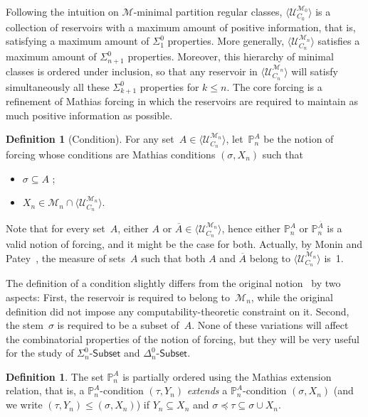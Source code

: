 \documentclass{article}
\def\PP{\mathbb{P}}
\def\U{\mathcal{U}}
\def\M{\mathcal{M}}
\def\PP{\mathbb{P}}
\newcommand{\Sub}[1]{{#1}\mbox{-}\mathsf{Subset}}
\numberwithin{theorem}{section}
\theoremstyle{definition}
\newtheorem{definition}[theorem]{Definition}
\begin{document}
Following the intuition on $\M$-minimal partition regular classes, $\langle \U_{C_0}^{\M_0} \rangle$ is a collection of reservoirs with a maximum amount of positive information, that is, satisfying a maximum amount of $\Sigma^0_1$ properties. More generally, $\langle \U_{C_n}^{\M_n} \rangle$ satisfies a maximum amount of $\Sigma^0_{n+1}$ properties. Moreover, this hierarchy of minimal classes is ordered under inclusion, so that any reservoir in $\langle \U_{C_n}^{\M_n} \rangle$ will satisfy simultaneously all these $\Sigma^0_{k+1}$ properties for $k \leq n$. The core forcing is a refinement of Mathias forcing in which the reservoirs are required to maintain as much positive information as possible.

\begin{definition}[Condition]
For any set~$A \in \langle \U_{C_n}^{\M_n} \rangle$, let~$\PP^A_n$ be the notion of forcing whose conditions are Mathias conditions $(\sigma, X_n)$ such that
 \begin{itemize}
    \item $\sigma \subseteq A$ ;
    \item $X_n \in \M_n \cap \langle \U_{C_n}^{\M_n} \rangle$.
\end{itemize}
\end{definition}

Note that for every set~$A$, either $A$ or $\overline{A} \in \langle \U_{C_n}^{\M_n} \rangle$, hence either $\PP^A_n$ or $\PP^{\overline{A}}_n$ is a valid notion of forcing, and it might be the case for both. Actually, by Monin and Patey~\cite[Proposition 2.7]{monin2022partition}, the measure of sets~$A$ such that both $A$ and $\overline{A}$ belong to $\langle \U_{C_n}^{\M_n} \rangle$ is~1.

The definition of a condition slightly differs from the original notion~\cite{monin2021weakness} by two aspects: First, the reservoir is required to belong to~$\M_n$, while the original definition did not impose any computability-theoretic constraint on it. Second, the stem~$\sigma$ is required to be a subset of~$A$. None of these variations will affect the combinatorial properties of the notion of forcing, but they will be very useful for the study of $\Sub{\Sigma^0_n}$ and $\Sub{\Delta^0_n}$.

\begin{definition}
The set $\PP^A_n$ is partially ordered using the Mathias extension relation, that is, a $\PP^A_n$-condition $(\tau,Y_n)$ \emph{extends} a $\PP^A_n$-condition $(\sigma,X_n)$ (and we write $(\tau,Y_n) \leq (\sigma,X_n)$) if $Y_n \subseteq X_n$ and $\sigma \preceq \tau \subseteq \sigma \cup X_n$.
\end{definition}
\end{document}
